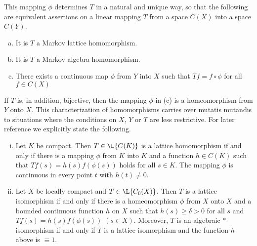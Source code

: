 This mapping $\phi$ determines $T$ in a natural and unique way, so that the following are equivalent assertions on a linear mapping $T$ from a space $C(X)$ into a space $C(Y)$.
\begin{enumerate}[(a)]
\item 
	It is $T$ a Markov lattice homomorphism.
\item 
	It is $T$ a Markov algebra homomorphism.
\item 
	There exists a continuous map $\phi$ from $Y$ into $X$ such that $Tf = f \circ \phi$ for all $f \in 	C(X)$
\end{enumerate}
If $T$ is, in addition, bijective, then the mapping $\phi$ in (c) is a homeomorphism from $Y$ onto $X$.
This characterization of homomorphisms carries over mutatis mutandis to situations where the conditions on $X$, $Y$ or $T$ are less restrictive.
For later reference we explicitly state the following.
\begin{enumerate}[(i)]
\item 
	Let $K$ be compact. Then $ T \in \L{C(K)} $ is a lattice homomorphism if and only if there is a mapping 
$\phi$ from $K$ into $K$ and a function $h \in C(K)$ such that $Tf(s) = h(s)f(\phi(s))$ holds for all $s \in K$.
The mapping $\phi$ is continuous in every point $t$ with $h(t) \neq 0$.

\item 
	Let $X$ be locally compact and $T \in \L{C_{0}(X)}$.
Then $T$ is a lattice isomorphism if and only if there is a homeomorphism $\phi$ from $X$ onto $X$ and a bounded continuous function $h$ on $X$ such that $h(s) \geq \delta > 0$ for all $s$ and $Tf(s) = h(s)f(\phi(s))$ $(s \in X)$.
Moreover, $T$ is an algebraic $*$-isomorphism if and only if $T$ is a lattice isomorphism and the function $h$ above is $\equiv 1$.
\end{enumerate}
